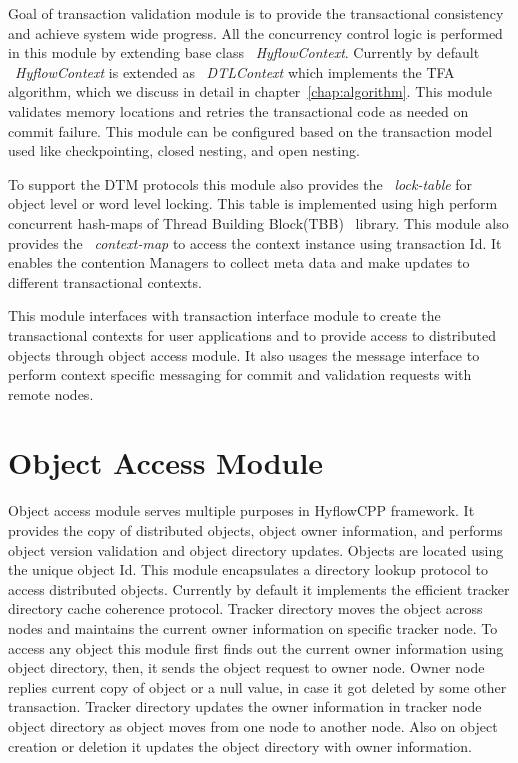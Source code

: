 \documentclass[12pt,english]{report}
\begin{document}
Goal of transaction validation module is to provide the transactional consistency and achieve system wide progress. All the concurrency control logic is performed in this module by extending base class ~\emph{HyflowContext}. Currently by default ~\emph{HyflowContext} is extended as ~\emph{DTLContext} which implements the TFA algorithm, which we discuss in detail in chapter~\ref{chap:algorithm}. This module validates memory locations and retries the transactional code as needed on commit failure. This module can be configured based on the transaction model used like checkpointing, closed nesting, and open nesting. 

To support the DTM protocols this module also provides the ~\emph{lock-table} for object level or word level locking. This table is implemented using high perform concurrent hash-maps of Thread Building Block(TBB)~\cite{willhalm2008putting} library. This module also provides the ~\emph{context-map} to access the context instance using transaction Id. It enables the contention Managers to collect meta data and make updates to different transactional contexts.

This module interfaces with transaction interface module to create the transactional contexts for user applications and to provide access to distributed objects through object access module. It also usages the message interface to perform context specific messaging for commit and validation requests with remote nodes.

\section{Object Access Module}

Object access module serves multiple purposes in HyflowCPP framework. It provides the copy of distributed objects, object owner information, and performs object version validation and object directory updates. Objects are located using the unique object Id. This module encapsulates a directory lookup protocol to access distributed objects. Currently by default it implements the efficient tracker directory cache coherence protocol. Tracker directory moves the object across nodes and maintains the current owner information on specific tracker node. To access any object this module first finds out the current owner information using object directory, then, it sends the object request to owner node. Owner node replies current copy of object or a null value, in case it got deleted by some other transaction. Tracker directory updates the owner information in tracker node object directory as object moves from one node to another node. Also on object creation or deletion it updates the object directory with owner information. 
\end{document}
